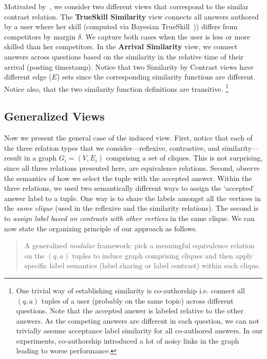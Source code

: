 Motivated by~\cite{Wu2016}, we consider two different views that correspond to the similar contrast relation. The \textbf{TrueSkill Similarity} view connects all answers authored by a user where her skill (computed via Bayesian TrueSkill~\cite{TrueSkill06})) differs from competitors by margin $\delta$. We capture both cases when the user is less or more skilled than her competitors. In the \textbf{Arrival Similarity} view, we connect answers across questions based on the similarity in the relative time of their arrival (posting timestamp).
Notice that two Similarity by Contrast views have different edge ($E$) sets since the corresponding similarity functions are different. Notice also, that the two similarity function definitions are transitive.
 \footnote{One trivial way of establishing similarity is co-authorship i.e. connect all $(q,a)$ tuples of a user (probably on the same topic) across different questions.
Note that the accepted answer is labeled relative to the other answers. As the competing answers are different in each question, we can not trivially assume acceptance label similarity for all co-authored answers. In our experiments, co-authorship introduced a lot of noisy links in the graph leading to worse performance.}

\subsection{Generalized Views}
\label{sub:Generalized Views}
Now we present the general case of the induced view. First, notice that each of the three relation types that we consider---reflexive, contrastive, and similarity---result in a graph $G_i = (V, E_i)$ comprising a set of cliques. This is not surprising, since all three relations presented here, are equivalence relations. Second, observe the semantics of how we select the tuple with the accepted answer. Within the three relations, we used two semantically different ways to assign the `accepted' answer label to a tuple. One way is to share the labels amongst all the vertices in the \textit{same clique} (used in the reflexive and the similarity relations). The second is to \textit{assign label based on contrasts with other vertices} in the same clique. We can now state the organizing principle of our approach as follows.
\begin{quote}
  A generalized \textit{modular} framework: pick a meaningful equivalence relation on the $(q,a)$ tuples to induce graph comprising cliques and then apply specific label semantics (label sharing or label contrast) within each clique.
\end{quote}

